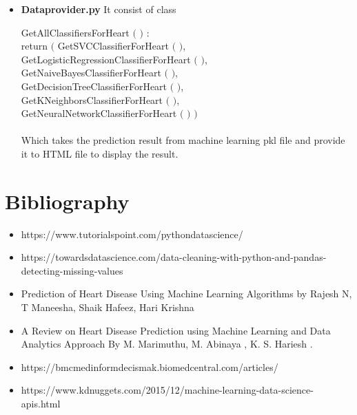 \documentclass[oneside,12pt]{Classes/VTU}
\begin{document}
\begin{itemize}
	\item \textbf{Dataprovider.py} It consist of class 
	
	GetAllClassifiersForHeart $($ $)$ : \\
return $($ GetSVCClassifierForHeart $($ $)$, \\
GetLogisticRegressionClassifierForHeart $($ $)$, \\
GetNaiveBayesClassifierForHeart $($ $)$, \\
GetDecisionTreeClassifierForHeart $($ $)$, \\
GetKNeighborsClassifierForHeart $($ $)$, \\
GetNeuralNetworkClassifierForHeart $($ $)$ $)$ \\
\\
Which takes the prediction result from machine learning pkl file and provide it to HTML file to display the result.
	\end{itemize}
	
%
\chapter*{Bibliography}
\begin{itemize}
		\item https://www.tutorialspoint.com/pythondatascience/   
		\item  https://towardsdatascience.com/data-cleaning-with-python-and-pandas-detecting-missing-values
		\item Prediction of Heart Disease Using Machine Learning Algorithms  by Rajesh N, T Maneesha, Shaik Hafeez, Hari Krishna 
		\item  A Review on Heart Disease Prediction using Machine Learning and Data Analytics Approach By M. Marimuthu, M. Abinaya , K. S. Hariesh .
		\item https://bmcmedinformdecismak.biomedcentral.com/articles/ 
		\item https://www.kdnuggets.com/2015/12/machine-learning-data-science-apis.html
	\end{itemize}
%
\end{document}
